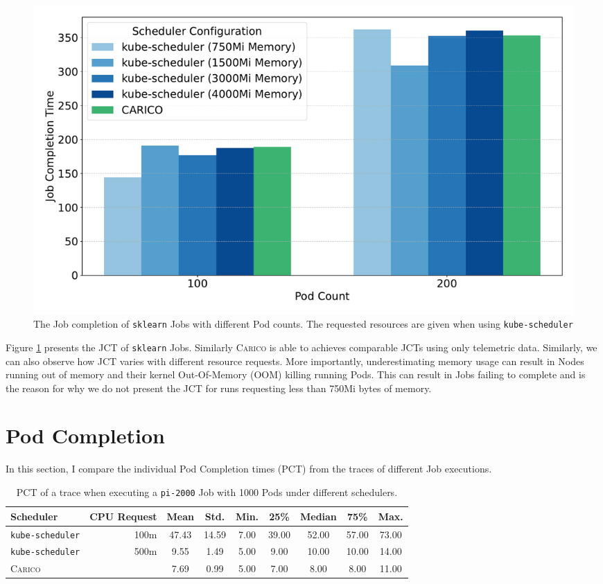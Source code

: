 \begin{figure}[ht!]
    \centering
    \includegraphics[width=\textwidth]{images/ml-job-completion.pdf}
    \caption{The Job completion of \texttt{sklearn} Jobs with different Pod
    counts. The requested resources are given when using
    \texttt{kube-scheduler}}
    \label{fig:ml-throughput}
\end{figure}

Figure \ref{fig:ml-throughput} presents the JCT of \texttt{sklearn}
Jobs. Similarly \textsc{Carico} is able to achieves comparable JCTs using only
telemetric data. Similarly, we can also observe how JCT varies with different
resource requests. More importantly, underestimating memory usage can result in
Nodes running out of memory and their kernel Out-Of-Memory (OOM) killing running Pods.
This can result in Jobs failing to complete and is the reason for why we do not
present the JCT for runs requesting less than 750Mi bytes of memory.

\section{Pod Completion}
\label{sec:eval-pod-completion}
In this section, I compare the individual Pod Completion times (PCT) from the
traces of different Job executions.

\begin{table}[h!]
\centering
    \begin{tabular}{|l|r|c|c|c|c|c|c|c|}
    \hline
        \bfseries Scheduler & \bfseries CPU Request & \bfseries Mean & \bfseries Std. &
        \bfseries Min. & \bfseries 25\% & \bfseries Median & \bfseries 75\% & \bfseries Max. \\
    \hline
        \texttt{kube-scheduler} & 100m & 47.43 & 14.59 & 7.00 & 39.00 & 52.00 & 57.00 & 73.00
        \\
        \texttt{kube-scheduler} & 500m & 9.55 & 1.49 & 5.00 & 9.00 & 10.00 & 10.00 & 14.00
        \\
        \textsc{Carico} & & 7.69 & 0.99 & 5.00 & 7.00 & 8.00 & 8.00 & 11.00 \\
    \hline
    \end{tabular}
    \caption{PCT of a trace when executing a \texttt{pi-2000} Job
    with 1000 Pods under different schedulers.}
    \label{tab:cpu-pod-completions}
\end{table}

